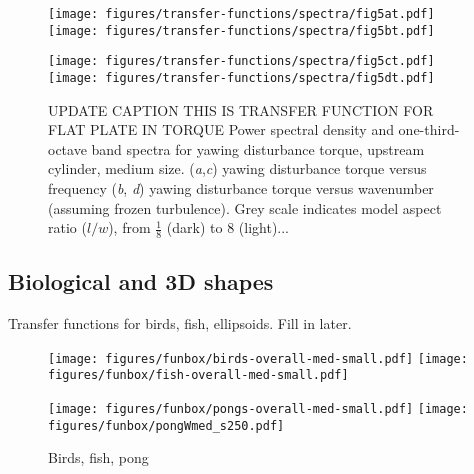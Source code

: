 \documentclass{jfm}
\begin{document}
\begin{figure} 
\centerline{\texttt{[image: figures/transfer-functions/spectra/fig5at.pdf]}%
\texttt{[image: figures/transfer-functions/spectra/fig5bt.pdf]}}
\centerline{\texttt{[image: figures/transfer-functions/spectra/fig5ct.pdf]}%
\texttt{[image: figures/transfer-functions/spectra/fig5dt.pdf]}}
\caption{UPDATE CAPTION THIS IS TRANSFER FUNCTION FOR FLAT PLATE IN TORQUE Power spectral density and one-third-octave band spectra for yawing disturbance torque, upstream cylinder, medium size. (\textit{a},\textit{c}) yawing disturbance torque versus frequency (\textit{b}, \textit{d}) yawing disturbance torque versus wavenumber (assuming frozen turbulence).  Grey scale indicates model aspect ratio ($l/w$), from $\frac{1}{8}$ (dark) to \num{8} (light)...}
\end{figure}



\subsection{Biological and 3D shapes}
Transfer functions for birds, fish, ellipsoids.  Fill in later. 

\begin{figure} 
\centerline{\texttt{[image: figures/funbox/birds-overall-med-small.pdf]}%
\texttt{[image: figures/funbox/fish-overall-med-small.pdf]}}
\centerline{\texttt{[image: figures/funbox/pongs-overall-med-small.pdf]}%
\texttt{[image: figures/funbox/pongWmed\_s250.pdf]}}
\caption{Birds, fish, pong}
\end{figure}


%
\end{document}

